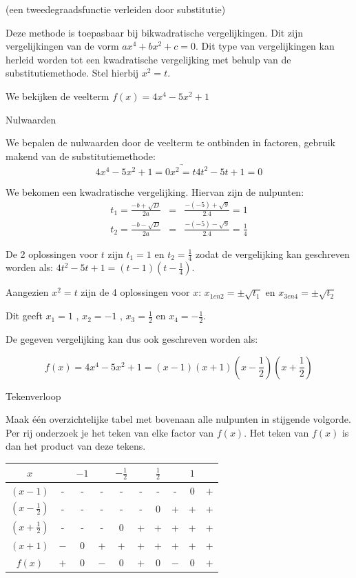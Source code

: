 \begin{voorbeeld}
	 (een tweedegraadsfunctie verleiden door substitutie)

Deze methode is toepasbaar bij bikwadratische vergelijkingen. Dit
zijn vergelijkingen van de vorm $ax^{4}+bx^{2}+c=0$. Dit type van
vergelijkingen kan herleid worden tot een kwadratische vergelijking
met behulp van de substitutiemethode. Stel hierbij $x^{2}=t$.

We bekijken de veelterm $f(x)=4x^{4}-5x^{2}+1$

Nulwaarden

 We bepalen de nulwaarden door de veelterm te ontbinden in
factoren, gebruik makend van de substitutiemethode:\\

\begin{equation*}
4x^{4}-5x^{2}+1=0  \underrightarrow{x^{2}=t}  4t^{2}-5t+1=0
\end{equation*}

 We bekomen een kwadratische vergelijking. Hiervan zijn de
nulpunten:
\begin{eqnarray*}
t_{1}=\frac{-b+\sqrt{D}}{2a}&=&\frac{-(-5)+\sqrt{9}}{2.4}=1 \\
t_{2}=\frac{-b-\sqrt{D}}{2a}&=&\frac{-(-5)-\sqrt{9}}{2.4}=\frac{1}{4}
\end{eqnarray*}

De 2 oplossingen voor $t$ zijn $t_{1}=1$ en $t_{2}=\frac{1}{4}$
zodat de vergelijking kan geschreven worden als: $4t^{2}-5t+1=(t-1)(t-\frac{1}{4})$.

Aangezien $x^{2}=t$ zijn de 4 oplossingen voor $x$: $x_{1en2}=\pm\sqrt{t_{1}}$
en $x_{3en4}=\pm\sqrt{t_{2}}$ 

Dit geeft $x_{1}=1$ , $x_{2}=-1$ , $x_{3}=\frac{1}{2}$
en $x_{4}=-\frac{1}{2}$.

De gegeven vergelijking kan dus ook geschreven worden als:

\begin{equation*}
f(x)=4x^{4}-5x^{2}+1=(x-1)(x+1)(x-\frac{1}{2})(x+\frac{1}{2})
\end{equation*}

Tekenverloop

Maak \'e\'en overzichtelijke tabel met bovenaan alle nulpunten
in stijgende volgorde. Per rij onderzoek je het teken van elke factor
van $f(x)$. Het teken van $f(x)$ is dan het product van deze tekens.

\begin{center}
\begin{tabular}{c||ccccccccc}
$x$ &  & $-1$ &  & $-\frac{1}{2}$ &  & $\frac{1}{2}$ &  & $1$ & \\
\hline 
$(x-1)$ & - & - & - & - & - & - & - & $0$ & $+$\\
$(x-\frac{1}{2})$ & - & - & - & - & -  & $0$ & + & + & + \\
$(x+\frac{1}{2})$ & - & - & - & $0$ & + & + & + & + & + \\
$(x+1)$ & $-$ & $0$ & + & + & + & + & + & + & + \\
\hline 
$f(x)$ & $+$ & $0$ & $-$ & $0$ & $+$ & $0$ & $-$ & $0$ & $+$\\
\end{tabular}
\end{center}


\end{voorbeeld}
